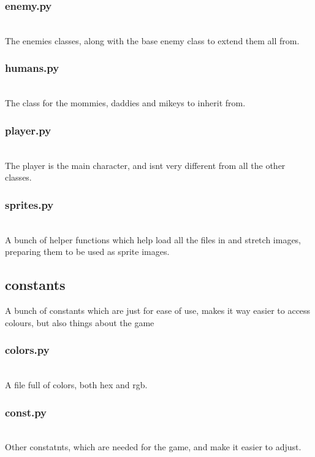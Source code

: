 \subsubsection{enemy.py}\\
The enemies classes, along with the base enemy class to extend them all from.


\subsubsection{humans.py}\\
The class for the mommies, daddies and mikeys to inherit from.


\subsubsection{player.py}\\
The player is the main character, and isnt very different from all the other classes.



\subsubsection{sprites.py}\\
A bunch of helper functions which help load all the files in and stretch images, preparing them to be used as sprite images.


\subsection{constants}
A bunch of constants which are just for ease of use, makes it way easier to access colours, but also things about the game
\subsubsection{colors.py}\\
A file full of colors, both hex and rgb.



\subsubsection{const.py}\\
Other constatnts, which are needed for the game, and make it easier to adjust.


